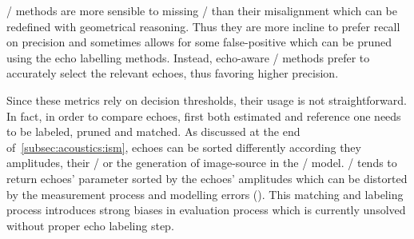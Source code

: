\begin{description}
    \RooGE/ methods are more sensible to missing \TOAs/ than their misalignment which can be redefined with geometrical reasoning.
    Thus they are more incline to prefer recall on precision and sometimes allows for some false-positive which can be pruned using the echo labelling methods.
    Instead, echo-aware \SE/ methods prefer to accurately select the relevant echoes, thus favoring higher precision.
\end{description}

Since these metrics rely on decision thresholds, their usage is not straightforward.
In fact, in order to compare echoes, first both estimated and reference one needs to be labeled, pruned and matched.
As discussed at the end of~\cref{subsec:acoustics:ism}, echoes can be sorted differently according they amplitudes, their \TOAs/ or the generation of image-source in the \ISM/ model.
\AER/ tends to return echoes' parameter sorted by the echoes' amplitudes which can be distorted by the measurement process and modelling errors ().
This matching and labeling process introduces strong biases in evaluation process which is currently unsolved without proper echo labeling step.